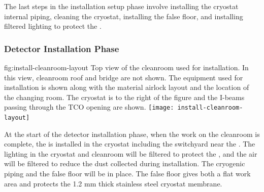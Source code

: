The last steps in the installation setup phase involve installing the cryostat internal piping, cleaning the cryostat, installing the false floor, and installing filtered lighting to protect the . 


\subsubsection{Detector Installation Phase}
\label{sec:fdsp-tc-inst-execute}

\begin{dunefigure}{fig:install-cleanroom-layout}
  {Top view of the cleanroom used for installation. In this view, cleanroom roof and bridge are not shown. The equipment used for installation is shown along with the material airlock layout and the location of the changing room. The cryostat is to the right of the figure and the I-beams passing through the TCO opening are shown.}
 \texttt{[image: install-cleanroom-layout]}
\end{dunefigure}

At the start of the detector installation phase, when the work on the cleanroom is complete, the  is installed in the cryostat including the switchyard near the . 
The lighting in the cryostat and cleanroom will be filtered to protect the , and the air will be filtered to reduce the dust collected during installation. 
The cryogenic piping and the false floor will be in place. 
The false floor gives both a flat work area and protects the 1.2 \si{mm} thick stainless steel cryostat membrane. 
          
